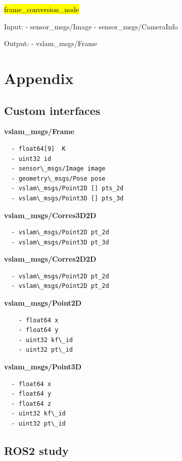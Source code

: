 \hl{frame\_conversion\_node}

Input: 
- sensor\_msgs/Image
- sensor\_msgs/CameraInfo

Output:
- vslam\_msgs/Frame


\section{Appendix}

\subsection{Custom interfaces}

\textbf{vslam\_msgs/Frame}
\begin{verbatim}
  - float64[9]  K 
  - uint32 id 
  - sensor\_msgs/Image image
  - geometry\_msgs/Pose pose
  - vslam\_msgs/Point2D [] pts_2d
  - vslam\_msgs/Point3D [] pts_3d
\end{verbatim}

\textbf{vslam\_msgs/Corres3D2D}
\begin{verbatim}
  - vslam\_msgs/Point2D pt_2d
  - vslam\_msgs/Point3D pt_3d
\end{verbatim}

\textbf{vslam\_msgs/Corres2D2D}
\begin{verbatim}
  - vslam\_msgs/Point2D pt_2d
  - vslam\_msgs/Point2D pt_2d
\end{verbatim}

\textbf{vslam\_msgs/Point2D}
\begin{verbatim}
    - float64 x 
    - float64 y 
    - uint32 kf\_id 
    - uint32 pt\_id 
\end{verbatim}


\textbf{vslam\_msgs/Point3D}
\begin{verbatim}
  - float64 x
  - float64 y  
  - float64 z 
  - uint32 kf\_id 
  - uint32 pt\_id 
\end{verbatim}


\subsection{ROS2 study}

